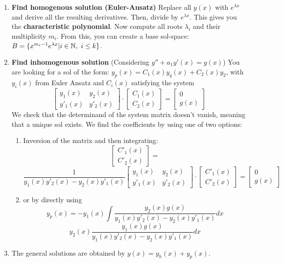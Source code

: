 \begin{concept}
    $ $\\
	\begin{enumerate}
		\item \textbf{Find homogenous solution (Euler-Ansatz)}
			Replace all $y(x)$ with $e^{\lambda x}$ and derive all the resulting derivatives.
			Then, divide by $e^{\lambda x}$. This gives you the \textbf{characteristic polynomial}.
			Now compute all roots $\lambda_i$ and their multiplicity $m_i$.
			From this, you can create a  base sol-space: $B = \{x^{m_i-1}e^{\lambda x} | i \in \mathbb{N}, \ i \leq k\}$.
		\item \textbf{Find inhomogenous solution}
			(Considering $y''+a_1y'(x) = g(x)$)
			You are looking for a sol of the form: $y_p(x) = C_1(x)y_q(x) + C_2(x)y_2$, with $y_i(x)$ from Euler Ansatz and $C_i(x)$ satisfying the system 
			$$\begin{bmatrix} y_1(x) & y_2(x) \\ y'_1(x) &  y'_2(x)\end{bmatrix} \cdot \begin{bmatrix}C_1(x) \\  C_2(x)\end{bmatrix} = \begin{bmatrix}0 \\ g(x)\end{bmatrix}$$
			We check that the determinand of the system matrix doesn't vanish, meaning that a unique sol exists.
			We find the coefficients by using one of two options:	
			\begin{enumerate}
				\item Inversion of the matrix and then integrating:
					$$\begin{bmatrix} C'_1(x) \\ C'_2(x)\end{bmatrix} = $$ $$\frac{1}{y_1(x)y'_2(x) - y_2(x)y'_1(x)}\begin{bmatrix} y_1(x) & y_2(x) \\ y'_1(x) & y'_2(x) \end{bmatrix} \cdot \begin{bmatrix}C'_1(x) \\ C'_2(x) \end{bmatrix} = \begin{bmatrix} 0 \\ g(x) \end{bmatrix}$$
				\item or by directly using
					$$y_p(x) = -y_1(x) \int \frac{y_2(x)g(x)}{y_1(x)y'_2(x) - y_2(x)y'_1(x)}dx $$ $$ y_2(x) \frac{y_1(x)g(x)}{y_1(x)y'_2(x) - y_2(x)y'_1(x)}dx$$
			\end{enumerate}
		\item The general solutions are obtained by $y(x) = y_h(x) + y_p(x)$.
	\end{enumerate}
\end{concept}

